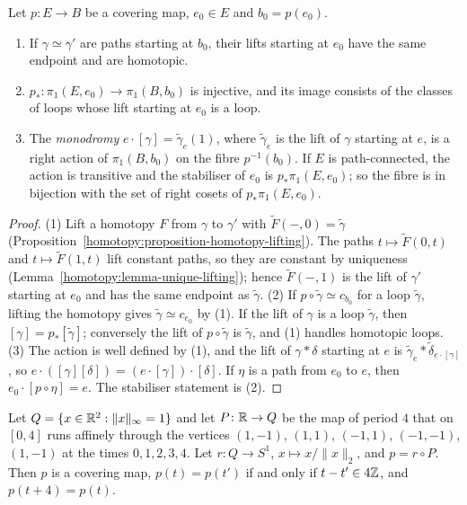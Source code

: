 \begin{corollary}\label{homotopy:corollary-lifting-consequences}
Let $p \colon E \to B$ be a covering map, $e_0 \in E$ and $b_0 = p(e_0)$.
\begin{enumerate}
\item If $\gamma \simeq \gamma'$ are paths starting at $b_0$, their lifts starting at $e_0$ have the same endpoint and are homotopic.
\item $p_* \colon \pi_1(E, e_0) \to \pi_1(B, b_0)$ is injective, and its image consists of the classes of loops whose lift starting at $e_0$ is a loop.
\item The \emph{monodromy} $e \cdot [\gamma] = \tilde\gamma_e(1)$, where $\tilde\gamma_e$ is the lift of $\gamma$ starting at $e$, is a right action of
$\pi_1(B, b_0)$ on the fibre $p^{-1}(b_0)$. If $E$ is path-connected, the action is transitive and the stabiliser of $e_0$ is $p_*\pi_1(E, e_0)$; so the
fibre is in bijection with the set of right cosets of $p_*\pi_1(E, e_0)$.
\end{enumerate}
\end{corollary}

\begin{proof}
(1) Lift a homotopy $F$ from $\gamma$ to $\gamma'$ with $\tilde{F}(-, 0) = \tilde\gamma$ (Proposition~\ref{homotopy:proposition-homotopy-lifting}). The paths
$t \mapsto \tilde{F}(0, t)$ and $t \mapsto \tilde{F}(1, t)$ lift constant paths, so they are constant by uniqueness
(Lemma~\ref{homotopy:lemma-unique-lifting}); hence $\tilde{F}(-, 1)$ is the lift of $\gamma'$ starting at $e_0$ and has the same endpoint as $\tilde\gamma$.
(2) If $p \circ \tilde\gamma \simeq c_{b_0}$ for a loop $\tilde\gamma$, lifting the homotopy gives $\tilde\gamma \simeq c_{e_0}$ by (1). If the lift of $\gamma$ is a
loop $\tilde\gamma$, then $[\gamma] = p_*[\tilde\gamma]$; conversely the lift of $p \circ \tilde\gamma$ is $\tilde\gamma$, and (1) handles homotopic loops.
(3) The action is well defined by (1), and the lift of $\gamma * \delta$ starting at $e$ is $\tilde\gamma_e * \tilde\delta_{e \cdot [\gamma]}$, so
$e \cdot ([\gamma][\delta]) = (e \cdot [\gamma]) \cdot [\delta]$. If $\eta$ is a path from $e_0$ to $e$, then $e_0 \cdot [p \circ \eta] = e$. The stabiliser
statement is (2).
\end{proof}

\begin{proposition}\label{homotopy:proposition-circle-covering}
Let $Q = \{x \in \mathbb{R}^2 : \|x\|_\infty = 1\}$ and let $P \colon \mathbb{R} \to Q$ be the map of period $4$ that on $[0, 4]$ runs affinely through the vertices
$(1, -1)$, $(1, 1)$, $(-1, 1)$, $(-1, -1)$, $(1, -1)$ at the times $0, 1, 2, 3, 4$. Let $r \colon Q \to S^1$, $x \mapsto x/\|x\|_2$, and $p = r \circ P$. Then $p$ is a
covering map, $p(t) = p(t')$ if and only if $t - t' \in 4\mathbb{Z}$, and $p(t + 4) = p(t)$.
\end{proposition}

